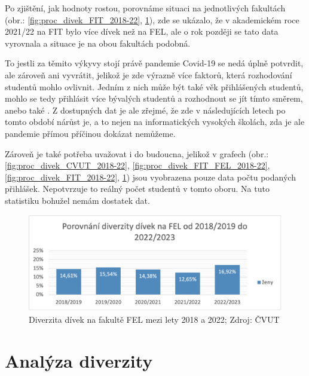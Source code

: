 \documentclass[12pt]{report}			%
\begin{document}
            Po zjištění, jak hodnoty rostou, porovnáme situaci na jednotlivých fakultách (obr.: \ref{fig:proc_divek_FIT_2018-22}, \ref{fig:proc_divek_FEL_2018-22}), zde se ukázalo, že v akademickém roce 2021/22 na FIT bylo více dívek než na FEL, ale o rok později se tato data vyrovnala a situace je na obou fakultách podobná.
            
            To jestli za těmito výkyvy stojí právě pandemie Covid-19 se nedá úplně potvrdit, ale zároveň ani vyvrátit, jelikož je zde výrazně více faktorů, která rozhodování studentů mohlo ovlivnit. Jedním z nich může být také věk přihlášených studentů, mohlo se tedy přihlásit více bývalých studentů a rozhodnout se jít tímto směrem, anebo také . Z dostupných dat je ale zřejmé, že zde v následujících letech po tomto období nárůst je, a to nejen na informatických vysokých školách, zda je ale pandemie přímou příčinou dokázat nemůžeme.
            
            Zároveň je také potřeba uvažovat i do budoucna, jelikož v grafech (obr.: \ref{fig:proc_divek_CVUT_2018-22}, \ref{fig:proc_divek_FIT_FEL_2018-22}, \ref{fig:proc_divek_FIT_2018-22}, \ref{fig:proc_divek_FEL_2018-22}) jsou vyobrazena pouze data počtu podaných přihlášek. Nepotvrzuje to reálný počet studentů v tomto oboru. Na tuto statistiku bohužel nemám dostatek dat.
            
            \begin{figure}
                \includegraphics[width=16cm]{Maturitni Prace/images/proc_divek_FEL_2018-22.png}
                \caption[Vizualizace diverzity na FEL 2018/20]{Diverzita dívek na fakultě FEL mezi lety 2018 a 2022; Zdroj: ČVUT}
                \label{fig:proc_divek_FEL_2018-22}
            \end{figure}
            
            
    
    \chapter{Analýza diverzity}
    	
\end{document}
